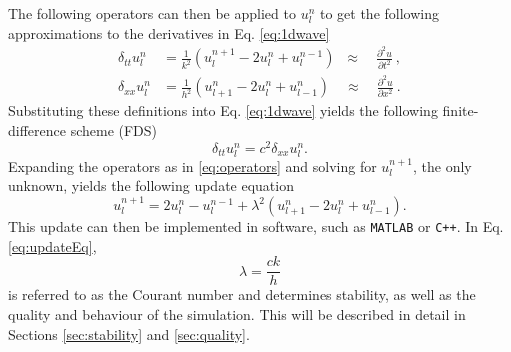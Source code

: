 The following operators can then be applied to $u_l^n$ to get the following approximations to the derivatives in Eq. \eqref{eq:1dwave}
\begin{subequations}\label{eq:operators}
    \begin{align}
         \delta_{tt}u_l^n &= \frac{1}{k^2}\left(u_l^{n+1}-2u_l^n + u_l^{n-1}\right)\;\;\approx\quad\frac{\partial^2u}{\partial t^2}\label{eq:secondOrderTime}\ ,\\
         \delta_{xx}u_l^n &= \frac{1}{h^2}\left(u_{l+1}^n-2u_l^n + u_{l-1}^n\right)\quad\approx\quad \frac{\partial^2u}{\partial x^2}\ .\label{eq:secondOrderSpace}
    \end{align}
\end{subequations}
Substituting these definitions into Eq. \eqref{eq:1dwave} yields the following finite-difference scheme (FDS)
\begin{equation}\label{eq:FDS}
    \delta_{tt}u_l^n = c^2 \delta_{xx}u_l^n.
\end{equation}
Expanding the operators as in %
\eqref{eq:operators} and solving for $u_l^{n+1}$, the only unknown, yields the following update equation
\begin{equation}\label{eq:updateEq}
    u_l^{n+1} = 2u_l^n-u_l^{n-1} + \lambda^2 \left(u_{l+1}^n-2u_l^n + u_{l-1}^n\right).
\end{equation}
This update can then be implemented in software, such as {\tt MATLAB} or {\tt C++}. In Eq. \eqref{eq:updateEq},
\begin{equation}\label{eq:lambdaDef}
    \lambda = \frac{ck}{h}
\end{equation}
is referred to as the Courant number and determines stability, as well as the quality and behaviour of the simulation. This will be described in detail in Sections \ref{sec:stability} and \ref{sec:quality}.

